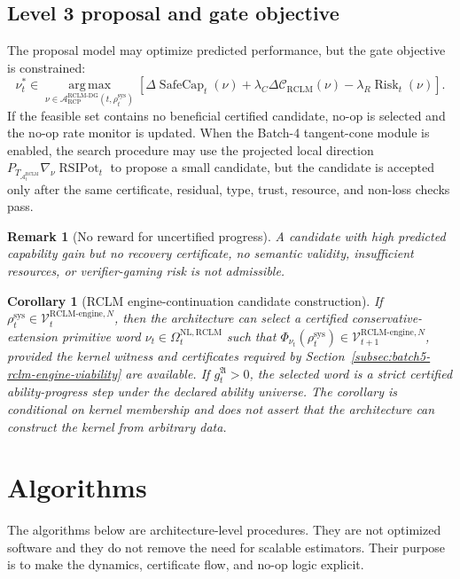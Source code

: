 \documentclass[11pt,a4paper]{article}
\newtheorem{corollary}[theorem]{Corollary}
\newtheorem{remark}[theorem]{Remark}
\newcommand{\Ccal}{\mathcal C}
\newcommand{\Acal}{\mathcal A}
\newcommand{\Vcal}{\mathcal V}
\newcommand{\argmax}{\operatorname*{arg\,max}}
\newcommand{\RCP}{\mathrm{RCP}}
\newcommand{\RCLM}{\mathrm{RCLM}}
\newcommand{\DG}{\mathrm{DG}}
\newcommand{\sys}{\mathrm{sys}}
\newcommand{\SafeCap}{\operatorname{SafeCap}}
\newcommand{\Risk}{\operatorname{Risk}}
\newcommand{\engine}{\mathrm{engine}}
\newcommand{\NL}{\mathrm{NL}}
\newcommand{\RSIPot}{\operatorname{RSIPot}}
\begin{document}
\subsection{Level 3 proposal and gate objective}

The proposal model may optimize predicted performance, but the gate objective is constrained:
\[
\nu_t^*
\in
\argmax_{\nu\in\Acal_{\RCP}^{\RCLM\text{-}\DG}(t,\rho_t^{\sys})}
\left[
\Delta\SafeCap_t(\nu)+\lambda_C\Delta\Ccal_{\RCLM}(\nu)-\lambda_R\Risk_t(\nu)
\right].
\]
If the feasible set contains no beneficial certified candidate, no-op is selected and the no-op rate monitor is updated.  When the Batch-4 tangent-cone module is enabled, the search procedure may use the projected local direction \(P_{T_{\Acal_t^{\RCLM}}}\nabla_\nu\RSIPot_t\) to propose a small candidate, but the candidate is accepted only after the same certificate, residual, type, trust, resource, and non-loss checks pass.

\begin{remark}[No reward for uncertified progress]
A candidate with high predicted capability gain but no recovery certificate, no semantic validity, insufficient resources, or verifier-gaming risk is not admissible.
\end{remark}



\begin{corollary}[RCLM engine-continuation candidate construction]
\label{cor:rclm-engine-continuation-candidate-construction-main}
If \(\rho_t^{\sys}\in\Vcal_t^{\RCLM\text{-}\engine,N}\), then the architecture can select a certified conservative-extension primitive word \(\nu_t\in\Omega_t^{\NL,\RCLM}\) such that \(\Phi_{\nu_t}(\rho_t^{\sys})\in\Vcal_{t+1}^{\RCLM\text{-}\engine,N}\), provided the kernel witness and certificates required by Section~\ref{subsec:batch5-rclm-engine-viability} are available.  If \(g_t^{\mathfrak A}>0\), the selected word is a strict certified ability-progress step under the declared ability universe.  The corollary is conditional on kernel membership and does not assert that the architecture can construct the kernel from arbitrary data.
\end{corollary}


\section{Algorithms}

The algorithms below are architecture-level procedures.  They are not optimized software and they do not remove the need for scalable estimators.  Their purpose is to make the dynamics, certificate flow, and no-op logic explicit.
\end{document}
